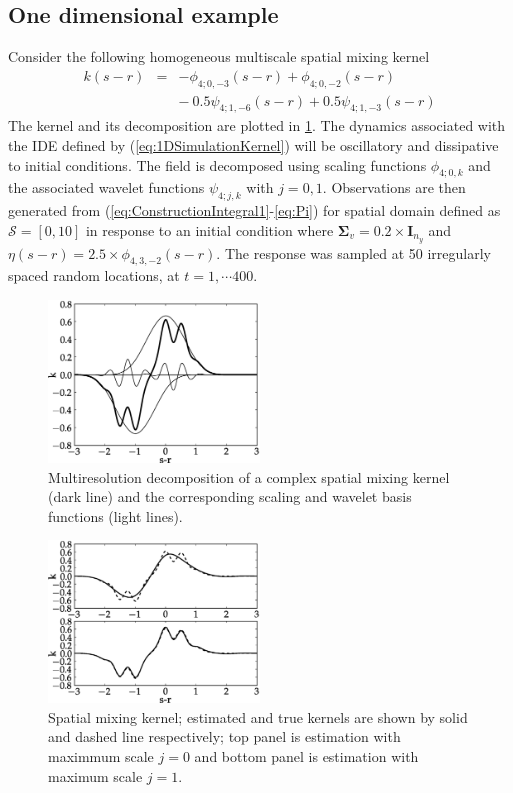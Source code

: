 \documentclass[11pt,draftcls,onecolumn,peerreview]{IEEEtran}
\begin{document}
\subsection{One dimensional example}
 Consider the following homogeneous multiscale spatial mixing kernel 
\setlength{\arraycolsep}{0.0em}
\begin{eqnarray}
k\left(s-r\right)&=& -\phi_{4;0,-3}\left(s-r\right)+\phi_{4;0,-2}\left(s-r\right)\nonumber\\
&&{-}\:0.5\psi_{4;1,-6}\left(s-r\right)+0.5\psi_{4;1,-3}\left(s-r\right)
\label{eq:1DSimulationKernel}
\end{eqnarray}
\setlength{\arraycolsep}{5pt}
The kernel and its decomposition are plotted in  \figurename{\ref{fig:SpatialMixingKernel}}. The dynamics associated with the IDE defined by (\ref{eq:1DSimulationKernel}) will be oscillatory and dissipative to initial conditions. The field is decomposed using scaling functions $\phi_{4;0,k} $ and the associated wavelet functions $\psi_{4;j,k} $ with $j=0,1$. Observations are then generated from (\ref{eq:ConstructionIntegral1}-\ref{eq:Pi}) for spatial domain defined as $\mathcal{S}=\left[0,10 \right] $ in response to an initial condition where $\boldsymbol\Sigma_v=0.2 \times \mathbf{I}_{n_y}$ and $ \eta(s-r)=2.5\times\phi_{4,3,-2}(s-r)$. The response was sampled at 50 irregularly spaced random locations, at $t=1, \cdots 400 $.
\begin{figure}[!h] 
\centering
\includegraphics[width=0.5\textwidth]{./Graph/aram1.eps}
\caption{Multiresolution decomposition of a complex spatial mixing kernel (dark line) and the corresponding scaling and wavelet basis functions (light lines).}
\label{fig:SpatialMixingKernel}
\end{figure} 
\begin{figure}[!h] 
\centering
\includegraphics[width=0.5\textwidth]{./Graph/aram2.eps}
\caption{Spatial mixing kernel; estimated and true kernels are shown by solid and dashed line respectively; top panel is estimation with maximmum scale $j=0$ and bottom panel is estimation with maximum scale $j=1$. }
\label{fig:SpatialMixingKernelEstimate}
\end{figure}
\end{document}
